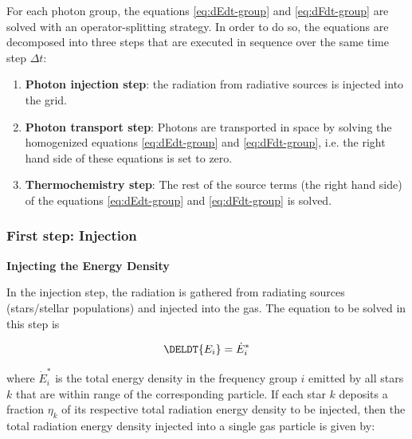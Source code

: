 For each photon group, the equations \ref{eq:dEdt-group} and \ref{eq:dFdt-group} are solved with an operator-splitting strategy.
In order to do so, the equations are decomposed into three steps that are executed in sequence over the same time step $\Delta t$:

\begin{enumerate}

\item \textbf{Photon injection step}: the radiation from radiative sources is injected into the grid.

\item \textbf{Photon transport step}: Photons are transported in space by solving the homogenized equations \ref{eq:dEdt-group} and \ref{eq:dFdt-group}, i.e. the right hand side of these equations is set to zero.

\item \textbf{Thermochemistry step}: The rest of the source terms (the right hand side) of the equations \ref{eq:dEdt-group} and \ref{eq:dFdt-group} is solved.
\end{enumerate}





\subsubsection{First step: Injection} \label{chap:injection-step}




\textbf{Injecting the Energy Density}


In the injection step, the radiation is gathered from radiating sources (stars/stellar populations) 
and injected into the gas. The equation to be solved in this step is

\begin{equation}
    \DELDT{E_i} = \dot{E}_i^* \label{eq:solve-dEdt}
\end{equation}

where $\dot{E}_i^*$ is the total energy density in the frequency group $i$ emitted by all stars $k$ 
that are within range of the corresponding particle. If each star $k$ deposits a fraction $\eta_k$ 
of its respective total radiation energy density to be injected, then the total radiation energy 
density injected into a single gas particle is given by:

